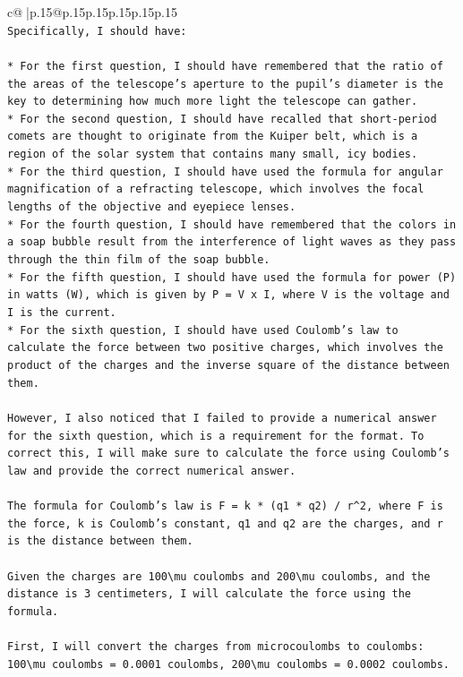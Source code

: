 \documentclass{article}
\begin{document}
{\begin{supertabular}{c@{$\;$}|p{.15\linewidth}@{}p{.15\linewidth}p{.15\linewidth}p{.15\linewidth}p{.15\linewidth}p{.15\linewidth}}
{{{\\ 
\texttt{Specifically, I should have:} \\
\\ 
\texttt{* For the first question, I should have remembered that the ratio of the areas of the telescope's aperture to the pupil's diameter is the key to determining how much more light the telescope can gather.} \\
\texttt{* For the second question, I should have recalled that short{-}period comets are thought to originate from the Kuiper belt, which is a region of the solar system that contains many small, icy bodies.} \\
\texttt{* For the third question, I should have used the formula for angular magnification of a refracting telescope, which involves the focal lengths of the objective and eyepiece lenses.} \\
\texttt{* For the fourth question, I should have remembered that the colors in a soap bubble result from the interference of light waves as they pass through the thin film of the soap bubble.} \\
\texttt{* For the fifth question, I should have used the formula for power (P) in watts (W), which is given by P = V x I, where V is the voltage and I is the current.} \\
\texttt{* For the sixth question, I should have used Coulomb's law to calculate the force between two positive charges, which involves the product of the charges and the inverse square of the distance between them.} \\
\\ 
\texttt{However, I also noticed that I failed to provide a numerical answer for the sixth question, which is a requirement for the format. To correct this, I will make sure to calculate the force using Coulomb's law and provide the correct numerical answer.} \\
\\ 
\texttt{The formula for Coulomb's law is F = k * (q1 * q2) / r\^{}2, where F is the force, k is Coulomb's constant, q1 and q2 are the charges, and r is the distance between them.} \\
\\ 
\texttt{Given the charges are 100\textbackslash{}mu coulombs and 200\textbackslash{}mu coulombs, and the distance is 3 centimeters, I will calculate the force using the formula.} \\
\\ 
\texttt{First, I will convert the charges from microcoulombs to coulombs: 100\textbackslash{}mu coulombs = 0.0001 coulombs, 200\textbackslash{}mu coulombs = 0.0002 coulombs.} \\
}}}
\end{supertabular}}
\end{document}
